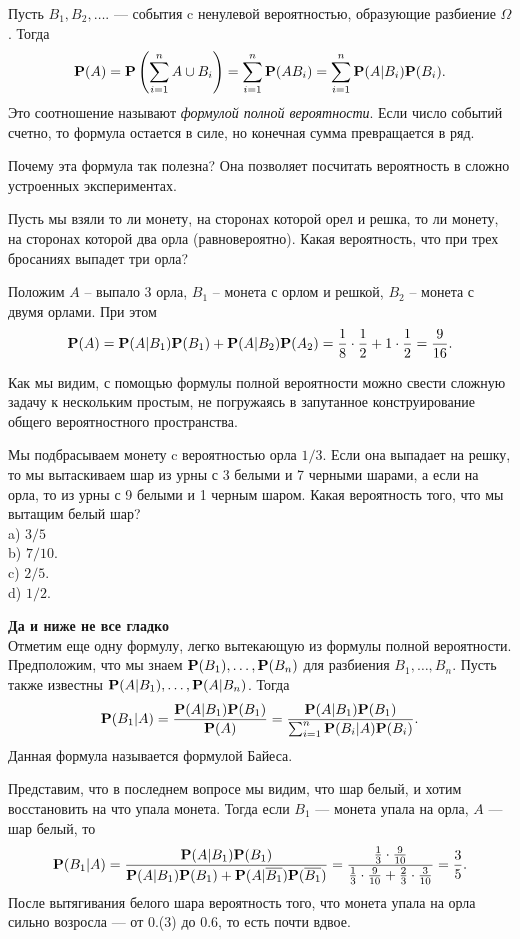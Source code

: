 \documentclass[11 pt,russian]{article}
\begin{document}
Пусть $B_1,B_2,\dotsc.$ --- события c ненулевой вероятностью, образующие разбиение $\Omega$. Тогда
$$
{\bf P}(A) = {\bf P}\left(\sum_{i=1}^{n} A\cup B_i\right) =
 \sum_{i=1}^{n} {\bf P}(AB_i) = \sum_{i=1}^{n} {\bf P}(A|B_i){\bf P}(B_i).
$$
Это соотношение называют {\it формулой полной вероятности}. Если число событий счетно, то формула остается в силе, но конечная сумма превращается в ряд.

Почему эта формула так полезна? Она позволяет посчитать вероятность в сложно устроенных экспериментах. 
\begin{Exam}
Пусть мы взяли то ли монету, на сторонах которой орел и решка, то ли монету, на сторонах которой два орла (равновероятно). Какая вероятность, что при трех бросаниях выпадет три орла?

Положим $A$ -- выпало 3 орла, $B_1$ -- монета с орлом и решкой, $B_2$ -- монета с двумя орлами. При этом 
$$
{\bf P}(A) = {\bf P}(A|B_1) {\bf P}(B_1) + {\bf P}(A|B_2) {\bf P}(A_2) = \frac{1}{8} \cdot \frac12 + 1\cdot \frac12 = \frac{9}{16}.
$$ 
\end{Exam}
Как мы видим, с помощью формулы полной вероятности можно свести сложную задачу к нескольким простым, не погружаясь в запутанное конструирование общего вероятностного пространства.
\begin{Que}
Мы подбрасываем монету c вероятностью орла $1/3$. Если она выпадает на решку, то мы вытаскиваем шар из урны с 3 белыми и 7 черными шарами, а если на орла, то из урны с 9 белыми и 1 черным шаром. Какая вероятность того, что мы вытащим белый шар?\\
a) $3/5$\\
b) $7/10$.\\
c) $2/5$.\\
d) $1/2$.
\end{Que}
{\bf Да и ниже не все гладко\\ }
Отметим еще одну формулу, легко вытекающую из формулы полной вероятности. Предположим, что мы знаем ${\bf P}(B_1),\dotsc,{\bf P}(B_n)$ для разбиения $B_1, \dotsc ,B_n$. Пусть также известны ${\bf P}(A|B_1),\dotsc,{\bf P}(A|B_n)$. Тогда 
$$
{\bf P}(B_1|A) = \frac{{\bf P}(A|B_1) {\bf P}(B_1)}{{\bf P}(A)} = \frac{{\bf P}(A|B_1) {\bf P}(B_1) }{\sum_{i=1}^{n} {\bf P}(B_i|A) {\bf P}(B_i)}.
$$
Данная формула называется формулой Байеса.
\begin{Exam}
Представим, что в последнем вопросе мы видим, что шар белый, и хотим восстановить на что упала монета. Тогда если $B_1$ --- монета упала на орла, $A$ --- шар белый, 
то
$$
{\bf P}(B_1|A) = \frac{{\bf P}(A|B_1) {\bf P}(B_1)}{{\bf P}(A|B_1) {\bf P}(B_1)+{\bf P}(A|\overline{B_1}) {\bf P}(\overline{B_1})} = \frac{\frac13 \cdot \frac{9}{10}}{\frac13 \cdot \frac{9}{10} + \frac23 \cdot \frac{3}{10}} = \frac{3}{5}.
$$
После вытягивания белого шара вероятность того, что монета упала на орла сильно возросла --- от 0.(3) до 0.6, то есть почти вдвое.
\end{Exam}
\end{document}
